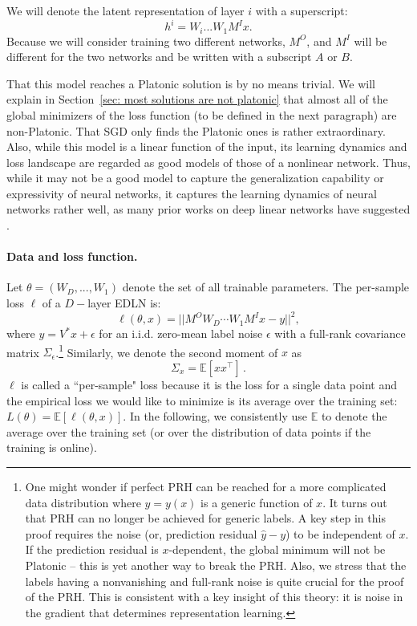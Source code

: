 \documentclass[11pt]{article}
\theoremstyle{plain}
\newcommand{\E}{\mathbb{E}}
\begin{document}
We will denote the latent representation of layer $i$ with a superscript:
\begin{equation}
    h^i =  W_i ... W_1 M^I x.
\end{equation}
Because we will consider training two different networks, $M^O$, and $M^I$ will be different for the two networks and be written with a subscript $A$ or $B$. 

That this model reaches a Platonic solution is by no means trivial. We will explain in Section~\ref{sec: most solutions are not platonic} that almost all of the global minimizers of the loss function (to be defined in the next paragraph) are non-Platonic. That SGD only finds the Platonic ones is rather extraordinary. Also, while this model is a linear function of the input, its learning dynamics and loss landscape are regarded as good models of those of a nonlinear network. Thus, while it may not be a good model to capture the generalization capability or expressivity of neural networks, it captures the learning dynamics of neural networks rather well, as many prior works on deep linear networks have suggested \cite{saxe2013exact}. 

\paragraph{Data and loss function.} Let $\theta = (W_D,...,W_1)$ denote the set of all trainable parameters. The per-sample loss $\ell$ of a $D-$layer EDLN is: 
\begin{equation}
\ell(\theta, x)=||M^OW_D\cdots W_1M^I x-y||^2,
\label{eq:loss_deep_linear}
\end{equation}
where $y = V^*x + \epsilon$ for an i.i.d. zero-mean label noise $\epsilon$ with a full-rank covariance matrix $\Sigma_\epsilon$.\footnote{One might wonder if perfect PRH can be reached for a more complicated data distribution where $y = y(x)$ is a generic function of $x$. It turns out that PRH can no longer be achieved for generic labels. A key step in this proof requires the noise (or, prediction residual $\hat{y}-y$) to be independent of $x$. If the prediction residual is $x$-dependent, the global minimum will not be Platonic -- this is yet another way to break the PRH. Also, we stress that the labels having a nonvanishing and full-rank noise is quite crucial for the proof of the PRH. This is consistent with a key insight of this theory: it is noise in the gradient that determines representation learning.} Similarly, we denote the second moment of $x$ as 
\begin{equation}
    \Sigma_x  = \E[xx^\top] \,.
\end{equation}
$\ell$ is called a ``per-sample" loss because it is the loss for a single data point and the empirical loss we would like to minimize is its average over the training set: $L(\theta) = \E[\ell(\theta,x)]$. In the following, we consistently use $\E$ to denote the average over the training set (or over the distribution of data points if the training is online).
\end{document}
